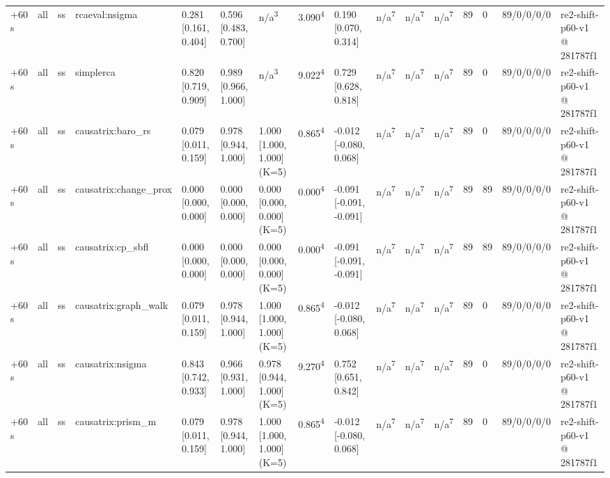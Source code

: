 \begin{table}[t]
\begin{tabular}{llllllllllllllll}
+60 s & all & ss & rcaeval:nsigma & 0.281 [0.161, 0.404] & 0.596 [0.483, 0.700] & n/a\textsuperscript{3} & 3.090\textsuperscript{4} & 0.190 [0.070, 0.314] & n/a\textsuperscript{7} & n/a\textsuperscript{7} & n/a\textsuperscript{7} & 89 & 0 & 89/0/0/0/0 & re2-shift-p60-v1 @ 281787f1 \\
+60 s & all & ss & simplerca & 0.820 [0.719, 0.909] & 0.989 [0.966, 1.000] & n/a\textsuperscript{3} & 9.022\textsuperscript{4} & 0.729 [0.628, 0.818] & n/a\textsuperscript{7} & n/a\textsuperscript{7} & n/a\textsuperscript{7} & 89 & 0 & 89/0/0/0/0 & re2-shift-p60-v1 @ 281787f1 \\
+60 s & all & ss & causatrix:baro\_rs & 0.079 [0.011, 0.159] & 0.978 [0.944, 1.000] & 1.000 [1.000, 1.000] (K=5) & 0.865\textsuperscript{4} & -0.012 [-0.080, 0.068] & n/a\textsuperscript{7} & n/a\textsuperscript{7} & n/a\textsuperscript{7} & 89 & 0 & 89/0/0/0/0 & re2-shift-p60-v1 @ 281787f1 \\
+60 s & all & ss & causatrix:change\_prox & 0.000 [0.000, 0.000] & 0.000 [0.000, 0.000] & 0.000 [0.000, 0.000] (K=5) & 0.000\textsuperscript{4} & -0.091 [-0.091, -0.091] & n/a\textsuperscript{7} & n/a\textsuperscript{7} & n/a\textsuperscript{7} & 89 & 89 & 89/0/0/0/0 & re2-shift-p60-v1 @ 281787f1 \\
+60 s & all & ss & causatrix:cp\_sbfl & 0.000 [0.000, 0.000] & 0.000 [0.000, 0.000] & 0.000 [0.000, 0.000] (K=5) & 0.000\textsuperscript{4} & -0.091 [-0.091, -0.091] & n/a\textsuperscript{7} & n/a\textsuperscript{7} & n/a\textsuperscript{7} & 89 & 89 & 89/0/0/0/0 & re2-shift-p60-v1 @ 281787f1 \\
+60 s & all & ss & causatrix:graph\_walk & 0.079 [0.011, 0.159] & 0.978 [0.944, 1.000] & 1.000 [1.000, 1.000] (K=5) & 0.865\textsuperscript{4} & -0.012 [-0.080, 0.068] & n/a\textsuperscript{7} & n/a\textsuperscript{7} & n/a\textsuperscript{7} & 89 & 0 & 89/0/0/0/0 & re2-shift-p60-v1 @ 281787f1 \\
+60 s & all & ss & causatrix:nsigma & 0.843 [0.742, 0.933] & 0.966 [0.931, 1.000] & 0.978 [0.944, 1.000] (K=5) & 9.270\textsuperscript{4} & 0.752 [0.651, 0.842] & n/a\textsuperscript{7} & n/a\textsuperscript{7} & n/a\textsuperscript{7} & 89 & 0 & 89/0/0/0/0 & re2-shift-p60-v1 @ 281787f1 \\
+60 s & all & ss & causatrix:prism\_m & 0.079 [0.011, 0.159] & 0.978 [0.944, 1.000] & 1.000 [1.000, 1.000] (K=5) & 0.865\textsuperscript{4} & -0.012 [-0.080, 0.068] & n/a\textsuperscript{7} & n/a\textsuperscript{7} & n/a\textsuperscript{7} & 89 & 0 & 89/0/0/0/0 & re2-shift-p60-v1 @ 281787f1 \\

\end{tabular}
\end{table}
